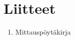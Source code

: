 \documentclass[a4paper, twoside, 12pt]{artikel3} %
\begin{document}

\section*{Liitteet} 
\begin{enumerate}[L{ii}te A:] %
	\item Mittauspöytäkirja
	
\end{enumerate}

\clearpage

% 
\end{document}
